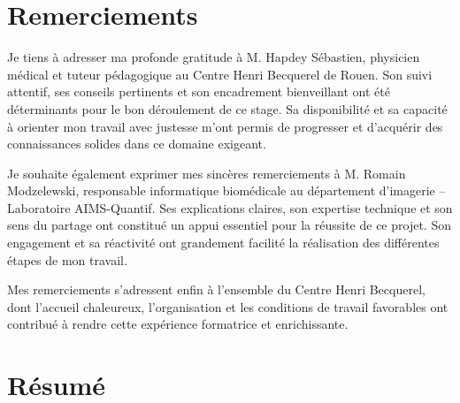 \documentclass[11pt,a4paper]{report}
\begin{document}


\chapter*{Remerciements}

Je tiens à adresser ma profonde gratitude à M. Hapdey Sébastien, physicien médical et tuteur pédagogique au Centre Henri Becquerel de Rouen. Son suivi attentif, ses conseils pertinents et son encadrement bienveillant ont été déterminants pour le bon déroulement de ce stage. Sa disponibilité et sa capacité à orienter mon travail avec justesse m'ont permis de progresser et d'acquérir des connaissances solides dans ce domaine exigeant.

Je souhaite également exprimer mes sincères remerciements à M. Romain Modzelewski, responsable informatique biomédicale au département d'imagerie – Laboratoire AIMS-Quantif. Ses explications claires, son expertise technique et son sens du partage ont constitué un appui essentiel pour la réussite de ce projet. Son engagement et sa réactivité ont grandement facilité la réalisation des différentes étapes de mon travail.

Mes remerciements s'adressent enfin à l'ensemble du Centre Henri Becquerel, dont l'accueil chaleureux, l'organisation et les conditions de travail favorables ont contribué à rendre cette expérience formatrice et enrichissante.

\chapter*{Résumé}
\end{document}
